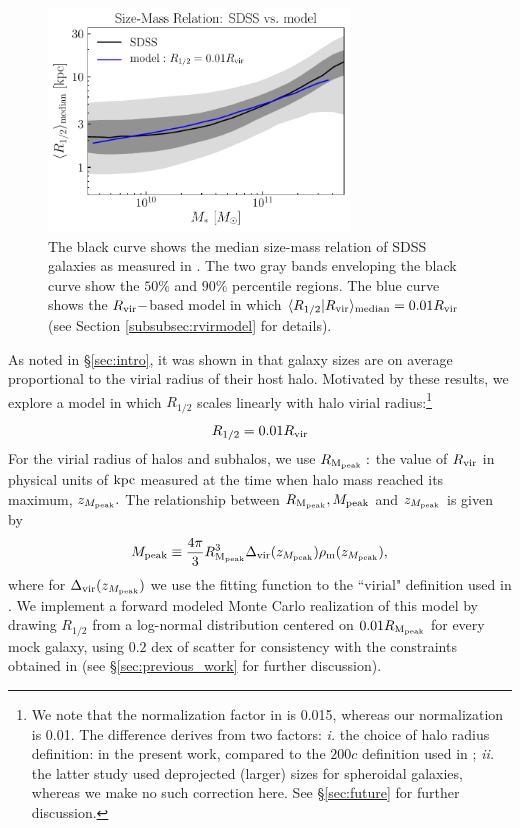 \documentclass[usenatbib,usegraphicx,letterpaper]{mn2e}
\newcommand{\beq}{\begin{equation}}
\newcommand{\eeq}{\end{equation}}
\newcommand{\rhalf}{R_{1/2}}
\newcommand{\mpeak}{M_{\rm peak}}
\newcommand{\zpeak}{z_{M_{\rm peak}}}
\newcommand{\rvir}{R_{\rm vir}}
\newcommand{\rmpeak}{R_{\rm M_{peak}}}
\newcommand{\median}[2]{\langle{#1}\vert{#2}\rangle_{\rm median}}
\newcommand{\kpc}{{\rm kpc}}
\begin{document}
\begin{figure}
\centering
\includegraphics[width=8cm]{FIGS/rvir_only_rhalf_vs_mstar_sham_model.pdf}
\caption{
The black curve shows the median size-mass relation of SDSS galaxies as measured in \citet{meert_etal15}. The two gray bands enveloping the black curve show the $50\%$ and $90\%$ percentile regions. The blue curve shows the $\rvir-$based model in which $\median{\rhalf}{\rvir}=0.01\rvir$ (see Section \ref{subsubsec:rvirmodel} for details).
}
\label{fig:scatter_plot}
\end{figure}

As noted in \S\ref{sec:intro}, it was shown in \citet{kravtsov13} that galaxy sizes are on average proportional to the virial radius of their host halo. Motivated by these results, we  explore a model in which $\rhalf$ scales linearly with halo virial radius:\footnote{We note that the normalization factor in \citet{kravtsov13} is 0.015, whereas our normalization is 0.01. The difference derives from two factors: {\em i.} the choice of halo radius definition: \citet{bryan_norman98} in the present work, compared to the $200c$ definition used in \citet{kravtsov13}; {\em ii.} the latter study used deprojected (larger) sizes for spheroidal galaxies, whereas we make no such correction here. See \S\ref{sec:future} for further discussion.}
\beq
\label{eq:fiducial_model}
\rhalf = 0.01\rvir
\eeq
For the virial radius of halos and subhalos, we use $\rmpeak:$ the value of $\rvir$ in physical units of $\kpc$ measured at the time when halo mass reached its maximum, $\zpeak.$  The relationship between $\rmpeak, \mpeak$ and $\zpeak$ is given by
\beq
\mpeak\equiv\frac{4\pi}{3}\rmpeak^{3}\Delta_{\rm vir}(\zpeak)\rho_{\rm m}(\zpeak),
\eeq
where for $\Delta_{\rm vir}(\zpeak)$ we use the fitting function to the ``virial" definition used in \citet{bryan_norman98}. We implement a forward modeled Monte Carlo realization of this model by drawing $\rhalf$ from a log-normal distribution centered on $0.01\rmpeak$ for every mock galaxy, using $0.2$ dex of scatter for consistency with the constraints obtained in \citet{somerville_etal17} (see \S\ref{sec:previous_work} for further discussion).
\end{document}
